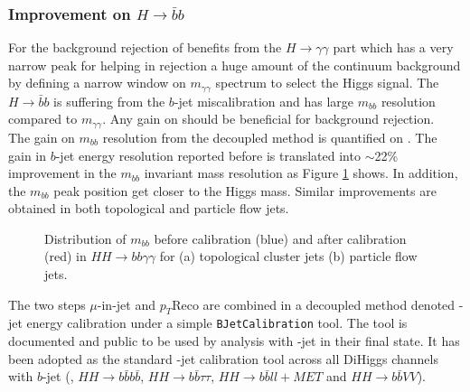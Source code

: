\subsubsection{Improvement on $H\rightarrow\bar{b}b$}
 For the background rejection of \HHyybb benefits from the $H\rightarrow\gamma\gamma$ part which has a very narrow peak for \myy helping in rejection a huge amount of the continuum background by defining a narrow window on $m_{\gamma\gamma}$ spectrum to select the Higgs signal. The $H\rightarrow\bar{b}b$ is suffering from the $b$-jet miscalibration and has  large $m_{bb}$ resolution compared to $m_{\gamma\gamma}$. Any gain on \mbb should be beneficial for background rejection.\\
The gain on $m_{bb}$ resolution from the decoupled method is quantified on \HHyybb. The gain in $b$-jet energy resolution reported before is translated into $\sim$22\% improvement in the $m_{bb}$ invariant mass resolution as Figure \ref{fig:Jet:Cal:BCal:Result:mbb} shows. In addition, the $m_{bb}$ peak position get closer to the Higgs mass. Similar improvements are obtained in both topological and particle flow jets. \\
\begin{figure}[htbp]
   \centering
   \quad
   \begin{tcolorbox}[colback=black!5!white,colframe=white!75!black]
   \caption{Distribution of $m_{bb}$ before calibration (blue) and after calibration (red) in $HH\rightarrow bb\gamma\gamma$ for (a) topological cluster jets (b) particle flow jets.}
   \label{fig:Jet:Cal:BCal:Result:mbb}
   \end{tcolorbox}
\end{figure}
The two steps $\mu$-in-jet and $p_T$Reco are combined in a decoupled method denoted \bq-jet energy calibration under a simple \texttt{BJetCalibration} tool. The tool is documented and public to be used by analysis with \bq-jet in their final state. It has been adopted as the standard \bq-jet calibration tool across all DiHiggs channels with $b$-jet (\HHyybb, $HH\rightarrow b\bar{b}b\bar{b}$, $HH\rightarrow b\bar{b}\tau\tau$,  $HH\rightarrow b\bar{b}ll+MET$ and $HH\rightarrow b\bar{b}VV$).

